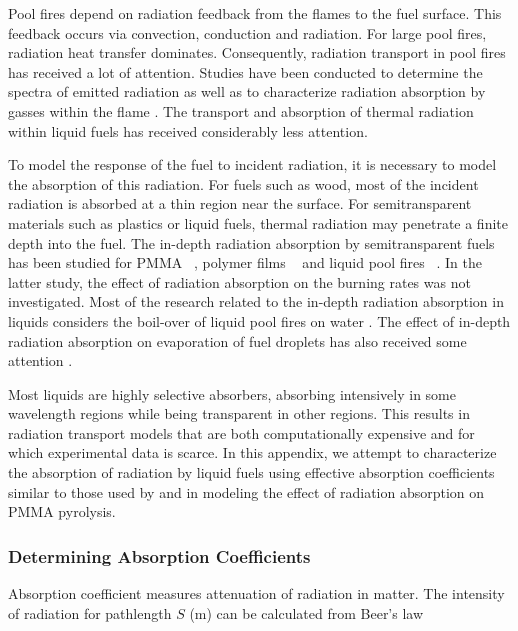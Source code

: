 Pool fires depend on radiation feedback from the flames to the fuel surface. This feedback occurs via convection, conduction and radiation. For large pool fires, radiation heat transfer dominates. Consequently, radiation transport in pool fires has received a lot of attention. Studies have been conducted to determine the spectra of emitted radiation \cite{Suo-Anttila:PCT2009} as well as to characterize radiation absorption by gasses within the flame \cite{Wakatsuki:CST2008}. The transport and absorption of thermal radiation within liquid fuels has received considerably less attention.

To model the response of the fuel to incident radiation, it is necessary to model the absorption of this radiation. For fuels such as wood, most of the incident radiation is absorbed at a thin region near the surface. For semitransparent materials such as plastics or liquid fuels, thermal radiation may penetrate a finite depth into the fuel. The in-depth radiation absorption by semitransparent fuels has been studied for PMMA ~\cite{Stoliarov:CF2009}, polymer films ~\cite{Tsilingiris:ECM2003} and liquid pool fires ~\cite{Suo-Anttila:PCT2009}. In the latter study, the effect of radiation absorption on the burning rates was not investigated. Most of the research related to the in-depth radiation absorption in liquids considers the boil-over of liquid pool fires on water \cite{Broeckmann:JLPPI1995}. The effect of in-depth radiation absorption on evaporation of fuel droplets has also received some attention \cite{Sazhin:IJHMT2004b}.

Most liquids are highly selective absorbers, absorbing intensively in some wavelength regions while being transparent in other regions. This results in radiation transport models that are both computationally expensive and for which experimental data is scarce. In this appendix, we attempt to characterize the absorption of radiation by liquid fuels using effective absorption coefficients similar to those used by \cite{Madhav:IJMP1995} and \cite{Manohar:JHT1995} in modeling the effect of radiation absorption on PMMA pyrolysis.

\subsubsection{Determining Absorption Coefficients}

Absorption coefficient measures attenuation of radiation in matter.  The intensity of radiation for pathlength $S$ (m) can be calculated from Beer's law

